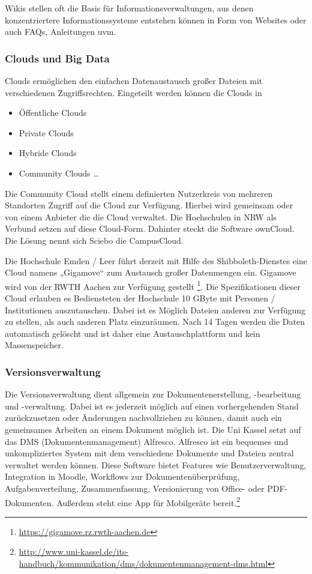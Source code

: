 \documentclass[a4paper, 12pt]{scrreprt}
\begin{document}
Wikis stellen oft die Basis für Informationsverwaltungen, aus denen konzentriertere Informationssysteme entstehen können in Form von Websites oder auch FAQs, Anleitungen uvm.



\subsubsection{Clouds und Big Data}
Clouds ermöglichen den einfachen Datenaustausch großer Dateien mit verschiedenen Zugriffsrechten. Eingeteilt werden können die Clouds in


\begin{itemize}
  \item Öffentliche Clouds
  \item Private Clouds
  \item Hybride Clouds
  \item Community Clouds \ldots
\end{itemize}

Die Community Cloud stellt einem definierten Nutzerkreis von mehreren Standorten Zugriff auf die Cloud zur Verfügung. Hierbei wird gemeinsam oder von einem Anbieter die die Cloud verwaltet. Die Hochschulen in NRW als Verbund setzen auf diese Cloud-Form. Dahinter steckt die Software ownCloud. Die Lösung nennt sich Sciebo die CampusCloud.

Die Hochschule Emden / Leer führt derzeit mit Hilfe des Shibboleth-Dienstes eine Cloud namens „Gigamove“ zum Austausch großer Datenmengen ein. Gigamove wird von der RWTH Aachen zur Verfügung gestellt \footnote{\url{https://gigamove.rz.rwth-aachen.de}}. Die Spezifikationen dieser Cloud erlauben es Bediensteten der Hochschule 10 GByte mit Personen / Institutionen auszutauschen. Dabei ist es Möglich Dateien anderen zur Verfügung zu stellen, als auch anderen Platz einzuräumen. Nach 14 Tagen werden die Daten automatisch gelöscht und ist daher eine Austauschplattform und kein Massenspeicher.

\subsubsection{Versionsverwaltung}
Die Versionsverwaltung dient allgemein zur Dokumentenerstellung, -bearbeitung und -verwaltung. Dabei ist es jederzeit möglich auf einen vorhergehenden Stand zurückzusetzen oder Änderungen nachvollziehen zu können, damit auch ein gemeinsames Arbeiten an einem Dokument möglich ist. Die Uni Kassel setzt auf das DMS (Dokumentenmanagement) Alfresco. Alfresco ist ein bequemes und unkompliziertes System mit dem verschiedene Dokumente und Dateien zentral verwaltet werden können. Diese Software bietet Features wie Benutzerverwaltung, Integration in Moodle, Workflows zur Dokumentenüberprüfung, Aufgabenverteilung, Zusammenfassung, Versionierung von Office- oder PDF-Dokumenten. Außerdem steht eine App für Mobilgeräte bereit.\footnote{\url{http://www.uni-kassel.de/its-handbuch/kommunikation/dms/dokumentenmanagement-dms.html}}
\end{document}
